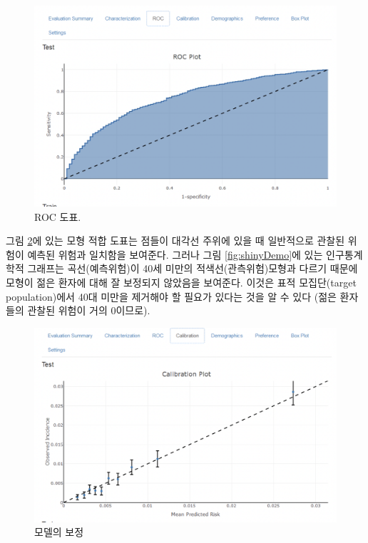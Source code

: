 \documentclass[11pt]{book}
\theoremstyle{definition}
\theoremstyle{definition}
\theoremstyle{definition}
\theoremstyle{remark}
\begin{document}
\begin{figure}

{\centering \includegraphics[width=1\linewidth]{images/PatientLevelPrediction/shiny/singleShiny/singleShinyRoc} 

}

\caption{ROC 도표.}\label{fig:shinyROC}
\end{figure}

그림 \ref{fig:shinyCal}에 있는 모형 적합 도표는 점들이 대각선 주위에
있을 때 일반적으로 관찰된 위험이 예측된 위험과 일치함을 보여준다. 그러나
그림 \ref{fig:shinyDemo}에 있는 인구통계학적 그래프는 곡선(예측위험)이
40세 미만의 적색선(관측위험)모형과 다르기 때문에 모형이 젊은 환자에 대해
잘 보정되지 않았음을 보여준다. 이것은 표적 모집단(target population)에서
40대 미만을 제거해야 할 필요가 있다는 것을 알 수 있다 (젊은 환자들의
관찰된 위험이 거의 0이므로).

\begin{figure}

{\centering \includegraphics[width=1\linewidth]{images/PatientLevelPrediction/shiny/singleShiny/singleShinyCal} 

}

\caption{모델의 보정}\label{fig:shinyCal}
\end{figure}
\end{document}
